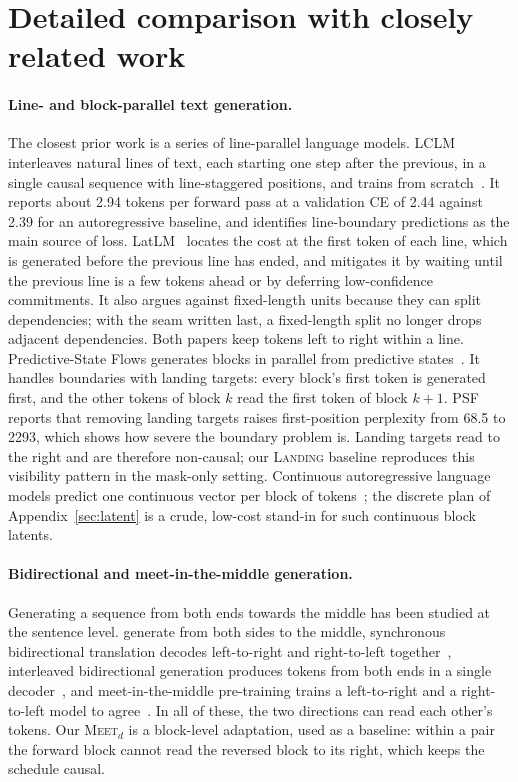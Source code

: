 \documentclass{article}
\theoremstyle{definition}
\theoremstyle{remark}
\newcommand{\name}[1]{\textup{\textsc{#1}}}
\newcommand{\landing}{\name{Landing}\xspace}
\newcommand{\meet}[1]{\name{Meet}$_{#1}$}
\begin{document}
\section{Detailed comparison with closely related work}
\label{app:related}

\paragraph{Line- and block-parallel text generation.}
The closest prior work is a series of line-parallel language models.
LCLM interleaves natural lines of text, each starting one step after the previous, in a single causal sequence with line-staggered positions, and trains from scratch~\citep{li2026lclm}.
It reports about 2.94 tokens per forward pass at a validation CE of 2.44 against 2.39 for an autoregressive baseline, and identifies line-boundary predictions as the main source of loss.
LatLM~\citep{zhang2026latlm} locates the cost at the first token of each line, which is generated before the previous line has ended, and mitigates it by waiting until the previous line is a few tokens ahead or by deferring low-confidence commitments.
It also argues against fixed-length units because they can split dependencies; with the seam written last, a fixed-length split no longer drops adjacent dependencies.
Both papers keep tokens left to right within a line.
Predictive-State Flows generates blocks in parallel from predictive states~\citep{he2026psf}.
It handles boundaries with landing targets: every block's first token is generated first, and the other tokens of block $k$ read the first token of block $k+1$.
PSF reports that removing landing targets raises first-position perplexity from 68.5 to 2293, which shows how severe the boundary problem is.
Landing targets read to the right and are therefore non-causal; our \landing baseline reproduces this visibility pattern in the mask-only setting.
Continuous autoregressive language models predict one continuous vector per block of tokens~\citep{shao2025calm}; the discrete plan of Appendix~\ref{sec:latent} is a crude, low-cost stand-in for such continuous block latents.

\paragraph{Bidirectional and meet-in-the-middle generation.}
Generating a sequence from both ends towards the middle has been studied at the sentence level.
\citet{zhou2019bothsides} generate from both sides to the middle, synchronous bidirectional translation decodes left-to-right and right-to-left together~\citep{zhou2019sbnmt}, interleaved bidirectional generation produces tokens from both ends in a single decoder~\citep{zhang2020interleaved}, and meet-in-the-middle pre-training trains a left-to-right and a right-to-left model to agree~\citep{nguyen2023meet}.
In all of these, the two directions can read each other's tokens.
Our \meet{d} is a block-level adaptation, used as a baseline: within a pair the forward block cannot read the reversed block to its right, which keeps the schedule causal.
\end{document}
